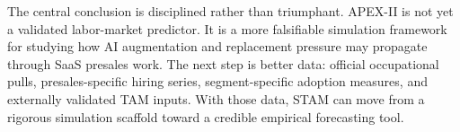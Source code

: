 \documentclass[10pt,conference]{IEEEtran}
\begin{document}
The central conclusion is disciplined rather than triumphant. APEX-II is not yet a validated labor-market predictor. It is a more falsifiable simulation framework for studying how AI augmentation and replacement pressure may propagate through SaaS presales work. The next step is better data: official occupational pulls, presales-specific hiring series, segment-specific adoption measures, and externally validated TAM inputs. With those data, STAM can move from a rigorous simulation scaffold toward a credible empirical forecasting tool.



\end{document}
